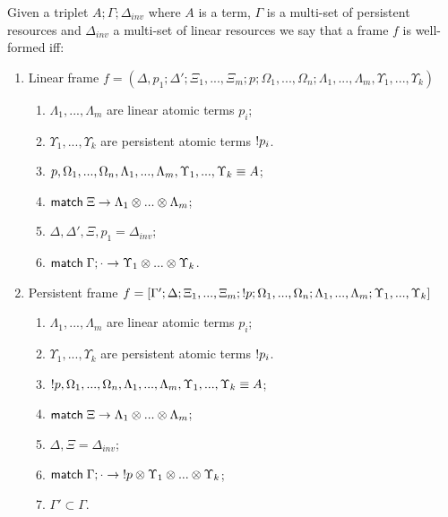 \begin{definition}

Given a triplet $A; \Gamma; \Delta_{inv}$ where $A$ is a term, $\Gamma$ is a multi-set of persistent resources and $\Delta_{inv}$ a multi-set of linear resources we say that a frame $f$ is well-formed iff:

\begin{enumerate}
   \item Linear frame $f = (\Delta, p_1; \Delta'; \Xi_1, ..., \Xi_m; p; \Omega_1, ..., \Omega_n; \Lambda_1, ..., \Lambda_m, \Upsilon_1, ..., \Upsilon_k)$
   \begin{enumerate}
      \item $\Lambda_1, ..., \Lambda_m$ are linear atomic terms $p_i$;
      \item $\Upsilon_1, ..., \Upsilon_k$ are persistent atomic terms ${!} p_i$.
      \item $p, \Omega_1, ..., \Omega_n, \Lambda_1, ..., \Lambda_m, \Upsilon_1, ..., \Upsilon_k \equiv A$;
      \item $\mathsf{match} \; \Xi \rightarrow \Lambda_1 \otimes ... \otimes \Lambda_m$;
      \item $\Delta, \Delta', \Xi, p_1 = \Delta_{inv}$;
      \item $\mathsf{match} \; \Gamma; \cdot \rightarrow \Upsilon_1 \otimes ... \otimes \Upsilon_k$.
   \end{enumerate}
   \item Persistent frame $f = [\Gamma'; \Delta; \Xi_1, ..., \Xi_m; {!} p; \Omega_1, ..., \Omega_n; \Lambda_1, ..., \Lambda_m; \Upsilon_1, ..., \Upsilon_k]$
      \begin{enumerate}
         \item $\Lambda_1, ..., \Lambda_m$ are linear atomic terms $p_i$;
         \item $\Upsilon_1, ..., \Upsilon_k$ are persistent atomic terms ${!} p_i$.
         \item ${!} p, \Omega_1, ..., \Omega_n, \Lambda_1, ..., \Lambda_m, \Upsilon_1, ..., \Upsilon_k \equiv A$;
         \item $\mathsf{match} \; \Xi \rightarrow \Lambda_1 \otimes ... \otimes \Lambda_m$;
         \item $\Delta, \Xi = \Delta_{inv}$;
         \item $\mathsf{match} \; \Gamma; \cdot \rightarrow {!} p \otimes \Upsilon_1 \otimes ... \otimes \Upsilon_k$;
         \item $\Gamma' \subset \Gamma$.
      \end{enumerate}
\end{enumerate}
\end{definition}

